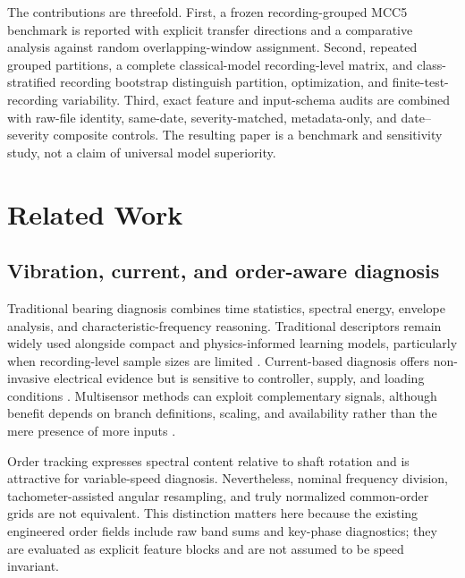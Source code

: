 \documentclass[machines,article,submit,oneauthor]{Definitions/mdpi}
\begin{document}
The contributions are threefold. First, a frozen recording-grouped MCC5 benchmark is reported with explicit transfer directions and a comparative analysis against random overlapping-window assignment. Second, repeated grouped partitions, a complete classical-model recording-level matrix, and class-stratified recording bootstrap distinguish partition, optimization, and finite-test-recording variability. Third, exact feature and input-schema audits are combined with raw-file identity, same-date, severity-matched, metadata-only, and date--severity composite controls. The resulting paper is a benchmark and sensitivity study, not a claim of universal model superiority.

\section{Related Work}
\subsection{Vibration, current, and order-aware diagnosis}
Traditional bearing diagnosis combines time statistics, spectral energy, envelope analysis, and characteristic-frequency reasoning. Traditional descriptors remain widely used alongside compact and physics-informed learning models, particularly when recording-level sample sizes are limited \cite{Hoang2018DLSurvey,Zhang2017CNNBearing,Ni2023PIResNet,Ruan2023CNNParameter}. Current-based diagnosis offers non-invasive electrical evidence but is sensitive to controller, supply, and loading conditions \cite{Gundewar2020InductionMotorReview,Toma2020MotorCurrentGA,Hoang2019MotorCurrentFusion,Guan2023MotorCurrentCausalConv}. Multisensor methods can exploit complementary signals, although benefit depends on branch definitions, scaling, and availability rather than the mere presence of more inputs \cite{Chen2017MultisensorSAE,Che2020HybridMultimodal,Wang2021ThreeStageFusion,Meng2023GraphAttentionFusion,You2024SoundVibrationPhysics,Xu2024HybridMultimodalFusion}.

Order tracking expresses spectral content relative to shaft rotation and is attractive for variable-speed diagnosis. Nevertheless, nominal frequency division, tachometer-assisted angular resampling, and truly normalized common-order grids are not equivalent. This distinction matters here because the existing engineered order fields include raw band sums and key-phase diagnostics; they are evaluated as explicit feature blocks and are not assumed to be speed invariant.
\end{document}
